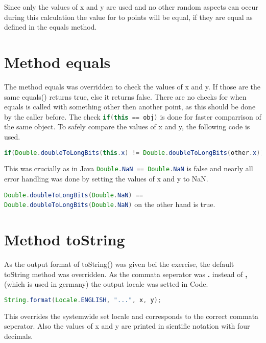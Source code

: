 Since only the values of x and y are used and no other random aspects can occur during this calculation the value for to points will be equal, if they are equal as defined in the equals method.

\section{Method equals}
The method equals was overridden to check the values of x and y. If those are the same equals() returns true, else it returns false. There are no checks for when equals is called with something other then another point, as this should be done by the caller before. The check \lstinline[language=java]{if(this == obj)} is done for faster comparrison of the same object.
To safely compare the values of x and y, the following code is used.
\begin{lstlisting}[language=java, caption=Safely compare double values in java]
    if(Double.doubleToLongBits(this.x) != Double.doubleToLongBits(other.x)) {...}
\end{lstlisting}

This was crucially as in Java \lstinline[language=java, breaklines=true]{Double.NaN == Double.NaN} is false and nearly all error handling was done by setting the values of x and y to NaN.

\lstinline[language=java, breaklines=true]{Double.doubleToLongBits(Double.NaN) == Double.doubleToLongBits(Double.NaN)} on the other hand is true.

\section{Method toString}
As the output format of toString() was given bei the exercise, the default toString method was overridden. As the commata seperator was \textbf{.} instead of \textbf{,} (which is used in germany) the output locale was setted in Code.
\begin{lstlisting}[language=java, caption=Setting locale to get correctly printed decimal seperator]
    String.format(Locale.ENGLISH, "...", x, y);
\end{lstlisting}
This overrides the systemwide set locale and corresponds to the correct commata seperator. Also the values of x and y are printed in sientific notation with four decimals.
